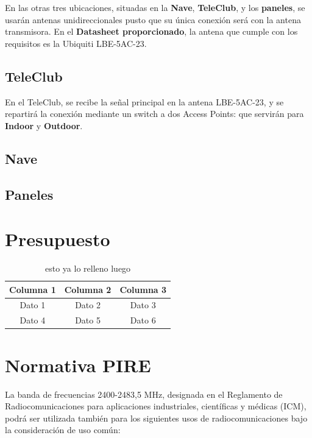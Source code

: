 \documentclass{article}
\begin{document}
\quad

En las otras tres ubicaciones, situadas en la \textbf{Nave}, \textbf{TeleClub}, y los \textbf{paneles}, se usarán antenas unidireccionales pusto que su única conexión será con la antena transmisora. En el \textbf{Datasheet proporcionado}, la antena que cumple con los requisitos es la Ubiquiti LBE-5AC-23.

\subsection{TeleClub}

En el TeleClub, se recibe la señal principal en la antena LBE-5AC-23, y se repartirá la conexión mediante un switch a dos Access Points: que servirán para \textbf{Indoor} y \textbf{Outdoor}.    


\subsection{Nave}
\subsection{Paneles}

\section{Presupuesto}

\begin{table}[h]
    \centering
    \begin{tabular}{|c|c|c|}
        \hline
        Columna 1 & Columna 2 & Columna 3 \\
        \hline
        Dato 1 & Dato 2 & Dato 3 \\
        Dato 4 & Dato 5 & Dato 6 \\
        \hline
    \end{tabular}
    \caption{esto ya lo relleno luego}
    \label{tab:presupuestos}
\end{table}


\section{Normativa PIRE}

La banda de frecuencias 2400-2483,5 MHz, designada en el Reglamento de
Radiocomunicaciones para aplicaciones industriales, científicas y médicas (ICM),
podrá ser utilizada también para los siguientes usos de radiocomunicaciones bajo la
consideración de uso común:
\end{document}
